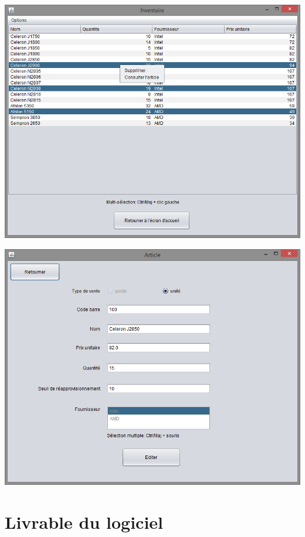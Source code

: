 \begin{center}
	\includegraphics[width=14cm]{./Implementation/inventaire}
\end{center}

\begin{center}
	\includegraphics[width=14cm]{./Implementation/article}
\end{center}

\section{Livrable du logiciel}

